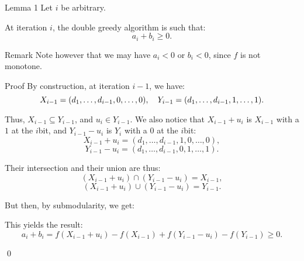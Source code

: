 \documentclass[a4paper]{article}
\begin{document}
\begin{parag}{Lemma 1}
    Let $i$ be arbitrary.

    At iteration $i$, the double greedy algorithm is such that: 
    \[a_i + b_i \geq 0.\]

    \begin{subparag}{Remark}
        Note however that we may have $a_i < 0$ or $b_i < 0$, since $f$ is not monotone.
    \end{subparag}

    \begin{subparag}{Proof}
        By construction, at iteration $i-1$, we have: 
        \[X_{i-1} = \left(d_1, \ldots, d_{i-1}, 0, \ldots, 0\right), \mathspace Y_{i-1} = \left(d_1, \ldots, d_{i-1}, 1, \ldots, 1\right).\]
        
        Thus, $X_{i-1} \subseteq Y_{i-1}$, and $u_i \in Y_{i-1}$. We also notice that $X_{i-1} + u_i$ is $X_{i-1}$ with a $1$ at the $i$\Th bit, and $Y_{i-1} - u_i$ is $Y_i$ with a 0 at the $i$\Th bit: 
        \[X_{i-1} + u_i = \left(d_1, \ldots, d_{i-1}, 1, 0, \ldots, 0\right),\]
        \[Y_{i-1} - u_i = \left(d_1, \ldots, d_{i-1}, 0, 1, \ldots, 1\right).\]
        
        Their intersection and their union are thus: 
        \[\left(X_{i-1} + u_i\right) \cap \left(Y_{i-1} - u_i\right) = X_{i-1},\]
        \[\left(X_{i-1} + u_i\right) \cup \left(Y_{i-1} - u_i\right) = Y_{i-1}.\]
        
        But then, by submodularity, we get: 
        
        This yields the result: 
        \[a_i + b_i = f\left(X_{i-1} + u_i\right) - f\left(X_{i-1}\right) + f\left(Y_{i-1} - u_i\right) - f\left(Y_{i-1}\right) \geq 0.\]

        \qed
    \end{subparag}
\end{parag}
\end{document}
